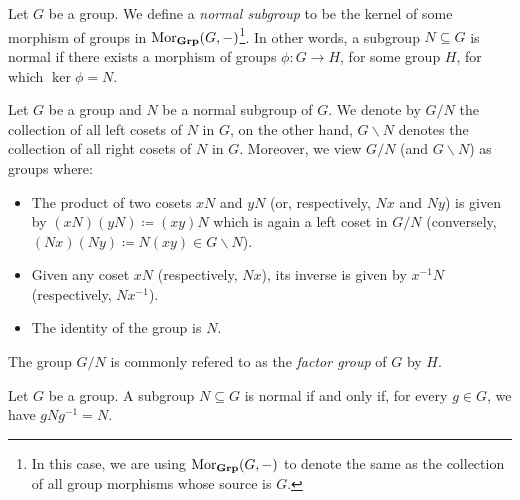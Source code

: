 \begin{definition}
\label{def:normal-subgroup}
Let \(G\) be a group. We define a \emph{normal subgroup} to be the kernel of
some morphism of groups in \(\operatorname{Mor}_{{\textbf{Grp}}}(G, -)\)\footnote{In this case, we are
using \(\operatorname{Mor}_{{\textbf{Grp}}}(G, -)\) to denote the same as the collection of all group
morphisms whose source is \(G\).}. In other words, a subgroup \(N \subseteq G\)
is normal if there exists a morphism of groups \(\phi: G \to H\), for some group
\(H\), for which \(\ker \phi = N\).
\end{definition}

\begin{definition}
\label{def:factor-group}
Let \(G\) be a group and \(N\) be a normal subgroup of \(G\). We denote by
\(G/N\) the collection of all left cosets of \(N\) in \(G\), on the other hand,
\(G \backslash N\) denotes the collection of all right cosets of \(N\) in
\(G\). Moreover, we view \(G/N\) (and \(G \backslash N\)) as groups where:
\begin{itemize}\setlength\itemsep{0em}
\item The product of two cosets \(x N\) and \(y N\) (or, respectively, \(N
  x\) and \(N y\)) is given by \((x N) (y N) \coloneq (x y) N\) which is again a
  left coset in \(G/N\) (conversely, \((N x) (N y) \coloneq N (x y) \in G
  \backslash N\)).
\item Given any coset \(x N\) (respectively, \(N x\)), its inverse is given by
  \(x^{-1} N\) (respectively, \(N x^{-1}\)).
\item The identity of the group is \(N\).
\end{itemize}
The group \(G/N\) is commonly refered to as the \emph{factor group} of \(G\) by
\(H\).
\end{definition}

\begin{proposition}
\label{prop:normal-subgroup-equivalence}
Let \(G\) be a group. A subgroup \(N \subseteq G\) is normal if and only if, for
every \(g \in G\), we have \(gNg^{-1} = N\).
\end{proposition}

